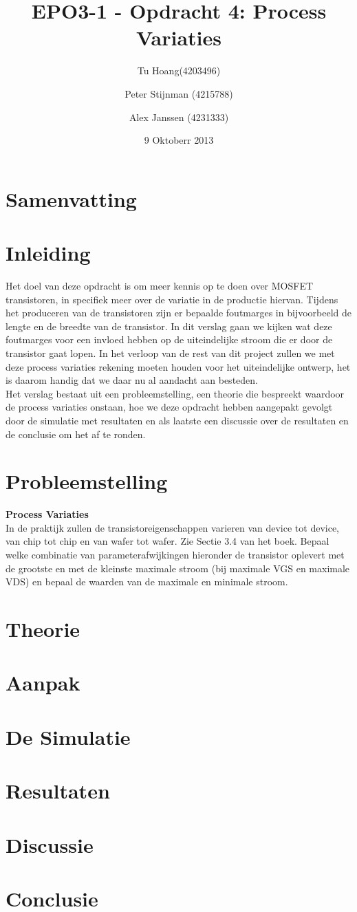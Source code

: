 \documentclass{article}
\author{
Tu Hoang(4203496) \and Peter Stijnman (4215788) \and Alex Janssen (4231333) \\
}
\title{EPO3-1 - Opdracht 4: Process Variaties}
\date{9 Oktoberr 2013}
\begin{document}
\maketitle

\section{Samenvatting}

\tableofcontents
\clearpage

\section{Inleiding}
Het doel van deze opdracht is om meer kennis op te doen over MOSFET transistoren, in specifiek meer over de variatie in de productie hiervan. Tijdens het produceren van de transistoren zijn er bepaalde foutmarges in bijvoorbeeld de lengte en de breedte van de transistor. In dit verslag gaan we kijken wat deze foutmarges voor een invloed hebben op de uiteindelijke stroom die er door de transistor gaat lopen. In het verloop van de rest van dit project zullen we met deze process variaties rekening moeten houden voor het uiteindelijke ontwerp, het is daarom handig dat we daar nu al aandacht aan besteden.\\
Het verslag bestaat uit een probleemstelling, een theorie die bespreekt waardoor de process variaties onstaan, hoe we deze opdracht hebben aangepakt gevolgt door de simulatie met resultaten en als laatste een discussie over de resultaten en de conclusie om het af te ronden.

\section{Probleemstelling}
\textbf{Process Variaties}\\
In de praktijk zullen de transistoreigenschappen varieren van device tot device, van chip tot chip en van 
wafer tot wafer. Zie Sectie 3.4 van het boek. Bepaal welke combinatie van parameterafwijkingen hieronder
de transistor oplevert met de grootste en met de kleinste maximale stroom (bij maximale VGS en maximale
VDS) en bepaal de waarden van de maximale en minimale stroom.

\section{Theorie}


\section{Aanpak}

\section{De Simulatie}

\section{Resultaten}

\section{Discussie}

\section{Conclusie}
\end{document}
